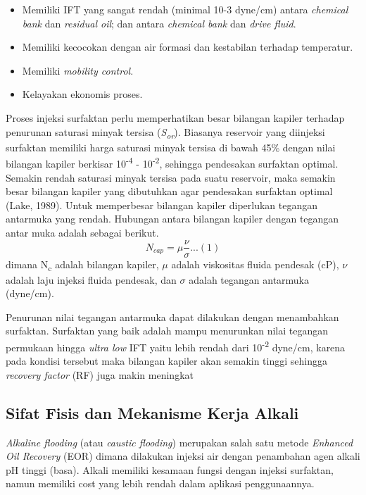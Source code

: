 \documentclass[
]{book}
\providecommand{\tightlist}{%
  \setlength{\itemsep}{0pt}\setlength{\parskip}{0pt}}
\begin{document}
\begin{itemize}
\tightlist
\item
  Memiliki IFT yang sangat rendah (minimal 10-3 dyne/cm) antara \emph{chemical bank} dan \emph{residual oil}; dan antara \emph{chemical bank} dan \emph{drive fluid}.
\item
  Memiliki kecocokan dengan air formasi dan kestabilan terhadap temperatur.
\item
  Memiliki \emph{mobility control}.
\item
  Kelayakan ekonomis proses.
\end{itemize}

Proses injeksi surfaktan perlu memperhatikan besar bilangan kapiler terhadap penurunan saturasi minyak tersisa (\emph{S\textsubscript{or}}). Biasanya reservoir yang diinjeksi surfaktan memiliki harga saturasi minyak tersisa di bawah 45\% dengan nilai bilangan kapiler berkisar 10\textsuperscript{-4} - 10\textsuperscript{-2}, sehingga pendesakan surfaktan optimal. Semakin rendah saturasi minyak tersisa pada suatu reservoir, maka semakin besar bilangan kapiler yang dibutuhkan agar pendesakan surfaktan optimal (Lake, 1989). Untuk memperbesar bilangan kapiler diperlukan tegangan antarmuka yang rendah. Hubungan antara bilangan kapiler dengan tegangan antar muka adalah sebagai berikut.
\[N_{cap}=\mu \frac{\nu}{\sigma}...(1)\]
dimana N\textsubscript{c} adalah bilangan kapiler, \(\mu\) adalah viskositas fluida pendesak (cP), \(\nu\) adalah laju injeksi fluida pendesak, dan \(\sigma\) adalah tegangan antarmuka (dyne/cm).

Penurunan nilai tegangan antarmuka dapat dilakukan dengan menambahkan surfaktan. Surfaktan yang baik adalah mampu menurunkan nilai tegangan permukaan hingga \emph{ultra low} IFT yaitu lebih rendah dari 10\textsuperscript{-2} dyne/cm, karena pada kondisi tersebut maka bilangan kapiler akan semakin tinggi sehingga \emph{recovery factor} (RF) juga makin meningkat

\hypertarget{sifat-fisis-dan-mekanisme-kerja-alkali}{%
\subsection{Sifat Fisis dan Mekanisme Kerja Alkali}\label{sifat-fisis-dan-mekanisme-kerja-alkali}}

\emph{Alkaline flooding} (atau \emph{caustic flooding}) merupakan salah satu metode \emph{Enhanced Oil Recovery} (EOR) dimana dilakukan injeksi air dengan penambahan agen alkali pH tinggi (basa). Alkali memiliki kesamaan fungsi dengan injeksi surfaktan, namun memiliki cost yang lebih rendah dalam aplikasi penggunaannya.
\end{document}
